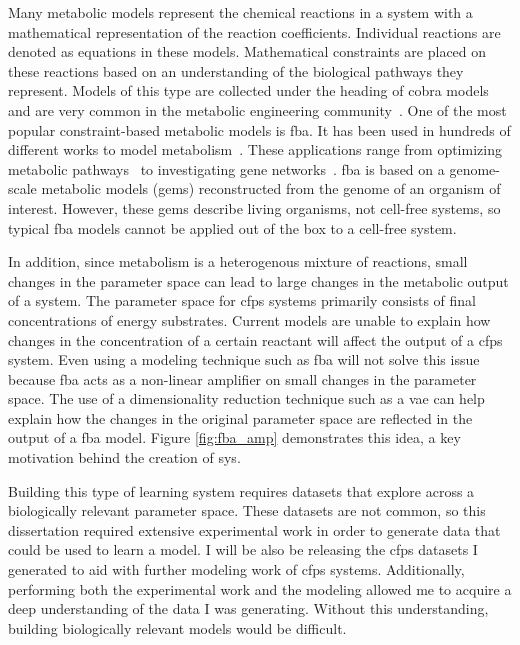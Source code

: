 Many metabolic models represent the chemical reactions in a system with a mathematical representation of the reaction coefficients.
Individual reactions are denoted as equations in these models.
Mathematical constraints are placed on these reactions based on an understanding of the biological pathways they represent.
Models of this type are collected under the heading of \gls{cobra} models~\cite{schellenberger2011quantitative} and are very common in the metabolic engineering community~\cite{orth2010flux}.
One of the most popular constraint-based metabolic models is \gls{fba}.
It has been used in hundreds of different works to model metabolism~\cite{feist2008growing}.
These applications range from optimizing metabolic pathways~\cite{almaas2004global} to investigating gene networks~\cite{shlomi2007genome}.
\gls{fba} is based on a genome-scale metabolic models (\glspl{gem}) reconstructed from the genome of an organism of interest.
However, these \glspl{gem} describe living organisms, not cell-free systems, so typical \gls{fba} models cannot be applied out of the box to a cell-free system.

In addition, since metabolism is a heterogenous mixture of reactions, small changes in the parameter space can lead to large changes in the metabolic output of a system.
The parameter space for \gls{cfps} systems primarily consists of final concentrations of energy substrates.
Current models are unable to explain how changes in the concentration of a certain reactant will affect the output of a \gls{cfps} system.
Even using a modeling technique such as \gls{fba} will not solve this issue because \gls{fba} acts as a non-linear amplifier on small changes in the parameter space.
The use of a dimensionality reduction technique such as a \gls{vae} can help explain how the changes in the original parameter space are reflected in the output of a \gls{fba} model.
Figure \ref{fig:fba_amp} demonstrates this idea, a key motivation behind the creation of \gls{sys}.

Building this type of learning system requires datasets that explore across a biologically relevant parameter space.
These datasets are not common, so this dissertation required extensive experimental work in order to generate data that could be used to learn a model.
I will be also be releasing the \gls{cfps} datasets I generated to aid with further modeling work of \gls{cfps} systems.
Additionally, performing both the experimental work and the modeling allowed me to acquire a deep understanding of the data I was generating.
Without this understanding, building biologically relevant models would be difficult.

